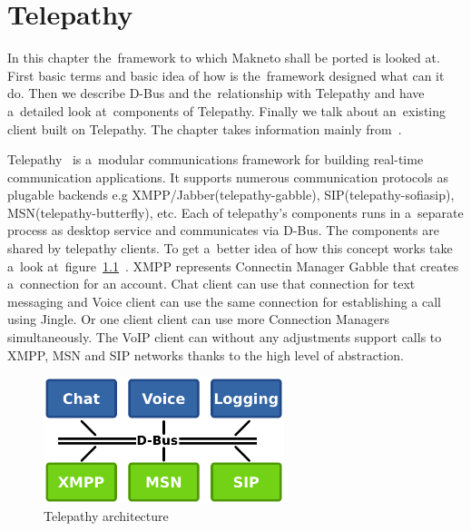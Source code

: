 
\chapter{Telepathy}\label{chapter:telepathy}
In this chapter the~framework to which Makneto shall be ported is looked at. First basic terms and basic idea of how is the~framework designed what can it do. Then we describe D-Bus and the~relationship with Telepathy and have a~detailed look at~components of Telepathy. Finally we talk about an~existing client built on Telepathy. The chapter takes information mainly from~\cite{TPWiki, dbus}. 

Telepathy~\cite{telepathy} is a~modular communications framework for building real-time communication applications. It supports numerous communication protocols as plugable backends e.g XMPP/Jabber(telepathy-gabble), SIP(telepathy-sofiasip), MSN(telepathy-butterfly), etc. Each of telepathy's components runs in a~separate process as desktop service and communicates via D-Bus. The components are shared by telepathy clients. To get a~better idea of how this concept works take a~look at~figure~\ref{fig:telepathyArchitecture}~\cite{TPWiki}. XMPP represents Connectin Manager Gabble that creates a~connection for an account. Chat client can use that connection for text messaging and Voice client can use the same connection for establishing a call using Jingle. Or one client client can use more Connection Managers simultaneously. The VoIP client can without any adjustments support calls to XMPP, MSN and SIP networks thanks to the high level of abstraction.

\begin{figure}[ht]
\begin{center}
	\includegraphics[width=7cm]{fig/telepathy-architecture-overview.png}
	\caption{Telepathy architecture~\cite{TPWiki}}
	\label{fig:telepathyArchitecture}
\end{center}
\end{figure}


